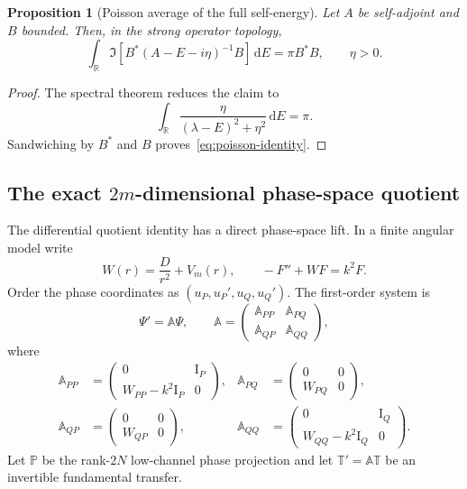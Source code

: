 \documentclass[11pt]{article}
\newcommand{\R}{\mathbb R}
\newcommand{\Id}{\mathrm I}
\newcommand{\dd}{\,\mathrm d}
\newtheorem{proposition}[theorem]{Proposition}
\theoremstyle{definition}
\theoremstyle{remark}
\begin{document}
\begin{proposition}[Poisson average of the full self-energy]\label{prop:poisson}
Let $A$ be self-adjoint and $B$ bounded.  Then, in the strong operator topology,
\begin{equation}
 \int_{\R}\Im\!\left[B^*(A-E-i\eta)^{-1}B\right]\dd E
 =\pi B^*B,
 \qquad \eta>0.
 \label{eq:poisson-identity}
\end{equation}
\end{proposition}

\begin{proof}
The spectral theorem reduces the claim to
\begin{equation}
 \int_{\R}\frac{\eta}{(\lambda-E)^2+\eta^2}\dd E=\pi.
\end{equation}
Sandwiching by $B^*$ and $B$ proves~\eqref{eq:poisson-identity}.
\end{proof}

\subsection{The exact $2m$-dimensional phase-space quotient}

The differential quotient identity has a direct phase-space lift.  In a
finite angular model write
\begin{equation}
 W(r)=\frac{D}{r^2}+V_m(r),
 \qquad
 -F''+WF=k^2F.
 \label{eq:finite-W}
\end{equation}
Order the phase coordinates as
$(u_P,u_P',u_Q,u_Q')$.  The first-order system is
\begin{equation}
 \Psi'=\mathbb A\Psi,
 \qquad
 \mathbb A=
 \begin{pmatrix}
  \mathbb A_{PP}&\mathbb A_{PQ}\\
  \mathbb A_{QP}&\mathbb A_{QQ}
 \end{pmatrix},
 \label{eq:phase-system}
\end{equation}
where
\begin{align}
 \mathbb A_{PP}
 &=\begin{pmatrix}0&\Id_P\\ W_{PP}-k^2\Id_P&0\end{pmatrix},
 &\mathbb A_{PQ}
 &=\begin{pmatrix}0&0\\W_{PQ}&0\end{pmatrix},
 \label{eq:phase-blocks-1}\\
 \mathbb A_{QP}
 &=\begin{pmatrix}0&0\\W_{QP}&0\end{pmatrix},
 &\mathbb A_{QQ}
 &=\begin{pmatrix}0&\Id_Q\\W_{QQ}-k^2\Id_Q&0\end{pmatrix}.
 \label{eq:phase-blocks-2}
\end{align}
Let $\mathbb P$ be the rank-$2N$ low-channel phase projection and let
$\mathbb T' =\mathbb A\mathbb T$ be an invertible fundamental transfer.
\end{document}
